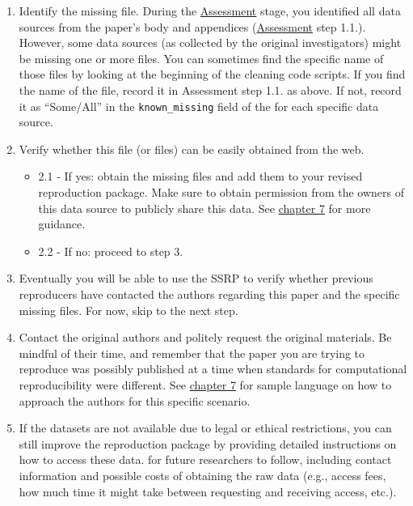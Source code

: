 \documentclass[
]{book}
\providecommand{\tightlist}{%
  \setlength{\itemsep}{0pt}\setlength{\parskip}{0pt}}
\begin{document}
\begin{enumerate}
\def\labelenumi{\arabic{enumi}.}
\tightlist
\item
  Identify the missing file. During the \protect\hyperlink{assessment}{Assessment} stage, you identified all data sources from the paper's body and appendices (\href{https://www.socialsciencereproduction.org/reproductions/6f421270-24a1-4540-af26-a91a3eb76d1d/assessment?step=0}{Assessment} step 1.1.). However, some data sources (as collected by the original investigators) might be missing one or more files. You can sometimes find the specific name of those files by looking at the beginning of the cleaning code scripts. If you find the name of the file, record it in Assessment step 1.1. as above. If not, record it as ``Some/All'' in the \texttt{known\_missing} field of the for each specific data source.\\
\item
  Verify whether this file (or files) can be easily obtained from the web.

  \begin{itemize}
  \tightlist
  \item
    2.1 - If yes: obtain the missing files and add them to your revised reproduction package. Make sure to obtain permission from the owners of this data source to publicly share this data. See \href{https://bitss.github.io/ACRE/guidance-for-a-constructive-exchange-between-reproducers-and-original-authors.html}{chapter 7} for more guidance.\\
  \item
    2.2 - If no: proceed to step 3.\\
  \end{itemize}
\item
  Eventually you will be able to use the SSRP to verify whether previous reproducers have contacted the authors regarding this paper and the specific missing files. For now, skip to the next step.
\item
  Contact the original authors and politely request the original materials. Be mindful of their time, and remember that the paper you are trying to reproduce was possibly published at a time when standards for computational reproducibility were different. See \href{https://bitss.github.io/ACRE/guidance-for-a-constructive-exchange-between-reproducers-and-original-authors.html}{chapter 7} for sample language on how to approach the authors for this specific scenario.\\
\item
  If the datasets are not available due to legal or ethical restrictions, you can still improve the reproduction package by providing detailed instructions on how to access these data. for future researchers to follow, including contact information and possible costs of obtaining the raw data (e.g., access fees, how much time it might take between requesting and receiving access, etc.).
\end{enumerate}
\end{document}
